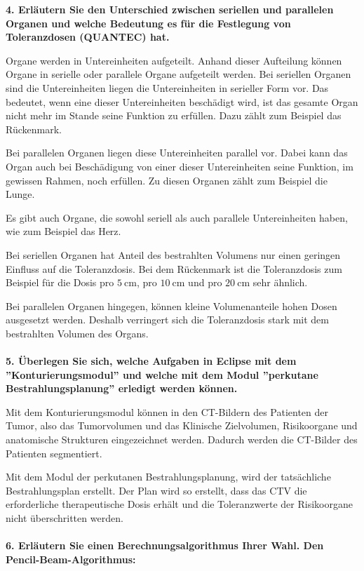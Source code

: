 \textbf{4. Erläutern Sie den Unterschied zwischen seriellen und parallelen Organen und
welche Bedeutung es für die Festlegung von Toleranzdosen (QUANTEC) hat.}

Organe werden in Untereinheiten aufgeteilt. Anhand dieser Aufteilung können Organe in
serielle oder parallele Organe aufgeteilt werden. Bei seriellen Organen sind die Untereinheiten
liegen die Untereinheiten in serieller Form vor.
Das bedeutet, wenn eine dieser Untereinheiten beschädigt wird, ist das gesamte Organ
nicht mehr im Stande seine Funktion zu erfüllen. Dazu zählt zum Beispiel das Rückenmark.

Bei parallelen Organen liegen diese Untereinheiten parallel vor. Dabei kann das Organ auch
bei Beschädigung von einer dieser Untereinheiten seine Funktion, im gewissen Rahmen, noch erfüllen.
Zu diesen Organen zählt zum Beispiel die Lunge.

Es gibt auch Organe, die sowohl seriell als auch parallele Untereinheiten haben, wie zum Beispiel das Herz.

Bei seriellen Organen hat Anteil des bestrahlten Volumens nur einen geringen Einfluss auf
die Toleranzdosis. Bei dem Rückenmark ist die Toleranzdosis zum Beispiel für die Dosis
pro $\SI{5}{\centi\meter}$, pro $\SI{10}{\centi\meter}$ und pro $\SI{20}{\centi\meter}$
sehr ähnlich.

Bei parallelen Organen hingegen, können kleine Volumenanteile hohen Dosen ausgesetzt
werden. Deshalb verringert sich die Toleranzdosis stark mit dem bestrahlten Volumen
des Organs. \\\\

\textbf{5. Überlegen Sie sich, welche Aufgaben in Eclipse mit dem ”Konturierungsmodul”
und welche mit dem Modul ”perkutane Bestrahlungsplanung” erledigt werden können.}

Mit dem Konturierungsmodul können in den CT-Bildern des Patienten der Tumor, also das Tumorvolumen und das Klinische Zielvolumen,
Risikoorgane und anatomische Strukturen eingezeichnet werden. Dadurch werden die CT-Bilder
des Patienten segmentiert.

Mit dem Modul der perkutanen Bestrahlungsplanung, wird der tatsächliche Bestrahlungsplan
erstellt. Der Plan wird so erstellt, dass das CTV die erforderliche therapeutische Dosis erhält und
die Toleranzwerte der Risikoorgane nicht überschritten werden. \\\\

\textbf{6. Erläutern Sie einen Berechnungsalgorithmus Ihrer Wahl. Den Pencil-Beam-Algorithmus:}


